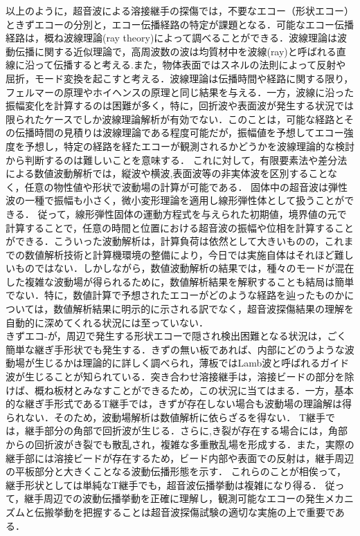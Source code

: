 %
%
以上のように，超音波による溶接継手の探傷では，不要なエコー（形状エコー）ときずエコーの分別と，エコー伝播経路の特定が課題となる．可能なエコー伝播経路は，概ね波線理論(ray theory)によって調べることができる\cite{JDA}．波線理論は波動伝播に関する近似理論で，高周波数の波は均質材中を波線(ray)と呼ばれる直線に沿って伝播すると考える.また，物体表面ではスネルの法則によって反射や屈折，モード変換を起こすと考える．波線理論は伝播時間や経路に関する限り，フェルマーの原理やホイヘンスの原理と同じ結果を与える．一方，波線に沿った振幅変化を計算するのは困難が多く，特に，回折波や表面波が発生する状況では限られたケースでしか波線理論解析が有効でない．このことは，可能な経路とその伝播時間の見積りは波線理論である程度可能だが，振幅値を予想してエコー強度を予想し，特定の経路を経たエコーが観測されるかどうかを波線理論的な検討から判断するのは難しいことを意味する．
これに対して，有限要素法や差分法による数値波動解析では，縦波や横波,表面波等の非実体波を区別することなく，任意の物性値や形状で波動場の計算が可能である．
固体中の超音波は弾性波の一種で振幅も小さく，微小変形理論を適用し線形弾性体として扱うことができる．
従って，線形弾性固体の運動方程式を与えられた初期値，境界値の元で計算することで，任意の時間と位置における超音波の振幅や位相を計算することができる．こういった波動解析は，計算負荷は依然として大きいものの，これまでの数値解析技術と計算機環境の整備により，今日では実施自体はそれほど難しいものではない．しかしながら，数値波動解析の結果では，種々のモードが混在した複雑な波動場が得られるために，数値解析結果を解釈することも結局は簡単でない．特に，数値計算で予想されたエコーがどのような経路を辿ったものかについては，数値解析結果に明示的に示される訳でなく，超音波探傷結果の理解を自動的に深めてくれる状況には至っていない．\\

%
%
きずエコ-が，周辺で発生する形状エコーで隠され検出困難となる状況は，ごく簡単な継ぎ手形状でも発生する．きずの無い板であれば、内部にどのうような波動場が生じるかは理論的に詳しく調べられ，薄板ではLamb波と呼ばれるガイド波が生じることが知られている．突き合わせ溶接継手は，溶接ビードの部分を除けば、概ね板材とみなすことができるため，この状況に当てはまる．一方，基本的な継ぎ手形式であるT継手では，きずが存在しない場合も波動場の理論解は得られない．そのため，波動場解析は数値解析に依らざるを得ない．
T継手では，継手部分の角部で回折波が生じる．さらに,き裂が存在する場合には，角部からの回折波がき裂でも散乱され，複雑な多重散乱場を形成する．また，実際の継手部には溶接ビードが存在するため，ビード内部や表面での反射は，継手周辺の平板部分と大きくことなる波動伝播形態を示す．
これらのことが相俟って，継手形状としては単純なT継手でも，超音波伝播挙動は複雑になり得る．
従って，継手周辺での波動伝播挙動を正確に理解し，観測可能なエコーの発生メカニズムと伝搬挙動を把握することは超音波探傷試験の適切な実施の上で重要である．
